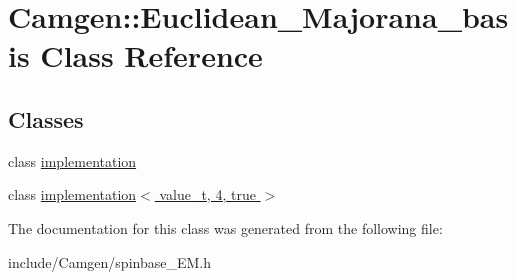 \hypertarget{a00135}{\section{Camgen\-:\-:Euclidean\-\_\-\-Majorana\-\_\-basis Class Reference}
\label{a00135}
}
\subsection*{Classes}
\begin{DoxyCompactItemize}
\item 
class \hyperlink{a00282}{implementation}
\item 
class \hyperlink{a00299}{implementation$<$ value\-\_\-t, 4, true $>$}
\end{DoxyCompactItemize}


The documentation for this class was generated from the following file\-:\begin{DoxyCompactItemize}
\item 
include/\-Camgen/spinbase\-\_\-\-E\-M.\-h\end{DoxyCompactItemize}

